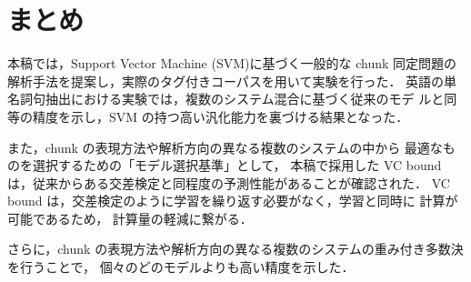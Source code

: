 \section{まとめ}
本稿では，Support Vector Machine (SVM)に基づく一般的な chunk 
同定問題の解析手法を提案し，実際のタグ付きコーパスを用いて実験を行った．
英語の単名詞句抽出における実験では，複数のシステム混合に基づく従来のモデ
ルと同等の精度を示し，SVM の持つ高い汎化能力を裏づける結果となった．

また，chunk の表現方法や解析方向の異なる複数のシステムの中から
最適なものを選択するための「モデル選択基準」として，
本稿で採用した VC bound は，従来からある交差検定と同程度の予測性能があることが確認された．
VC bound は，交差検定のように学習を繰り返す必要がなく，学習と同時に
計算が可能であるため， 計算量の軽減に繋がる．

さらに，chunk の表現方法や解析方向の異なる複数のシステムの重み付き多数決を行うことで，
個々のどのモデルよりも高い精度を示した．




\begin{biography}


\end{biography}

